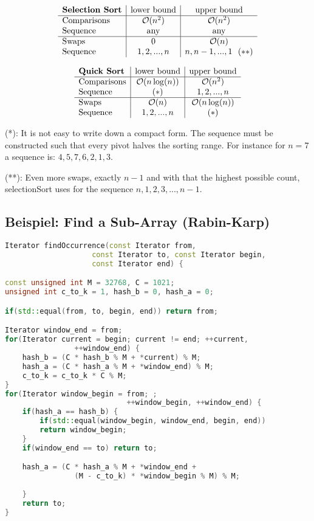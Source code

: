 \begin{sectionbox}

$$
  \begin{array}{l | c | c }
    \textbf{Selection Sort} & \text{lower bound} & \text{upper bound}\\ \hline
    \text{Comparisons} & \mathcal{O}(n^2) & \mathcal{O}(n^2)\\
    \text{Sequence} & \text{any} & \text{any} \\ \hline
    \text{Swaps} & 0 & \mathcal{O}(n)\\
    \text{Sequence} & 1,2,...,n & n,n-1,...,1 ~~(**) \\
  \end{array}
$$


$$
  \begin{array}{l | c | c }
    \textbf{Quick Sort} & \text{lower bound} & \text{upper bound}\\ \hline
    \text{Comparisons} & \mathcal{O}(n\log(n))& \mathcal{O}(n^2) \\
    \text{Sequence} & (*) & 1,2,...,n \\ \hline
    \text{Swaps} & \mathcal{O}(n) & \mathcal{O}(n \log(n))  \\
    \text{Sequence} & 1,2,...,n & (*) \\
  \end{array}
$$


(*): It is not easy to write down a compact form. The sequence must be constructed such that every pivot halves the sorting range. For instance for $n=7$ a sequence is: $4,5,7,6,2,1,3$.

(**): Even more swaps, exactly $n-1$ and with that the highest possible count, selectionSort uses for the sequence $n, 1, 2, 3, ..., n-1$.
\end{sectionbox}

\subsection{Beispiel: Find a Sub-Array (Rabin-Karp)}
\begin{lstlisting}[language=C++]
Iterator findOccurrence(const Iterator from, 
                    const Iterator to, const Iterator begin, 
                    const Iterator end) {

const unsigned int M = 32768, C = 1021;
unsigned int c_to_k = 1, hash_b = 0, hash_a = 0; 

if(std::equal(from, to, begin, end)) return from; 

Iterator window_end = from;
for(Iterator current = begin; current != end; ++current,
                ++window_end) {
    hash_b = (C * hash_b % M + *current) % M; 
    hash_a = (C * hash_a % M + *window_end) % M; 
    c_to_k = c_to_k * C % M; 
}
for(Iterator window_begin = from; ; 
                            ++window_begin, ++window_end) {
    if(hash_a == hash_b) {
        if(std::equal(window_begin, window_end, begin, end)) 
        return window_begin; 
    }
    if(window_end == to) return to;

    hash_a = (C * hash_a % M + *window_end + 
                (M - c_to_k) * *window_begin % M) % M; 
    
    } 
    return to;
} 
\end{lstlisting} 

